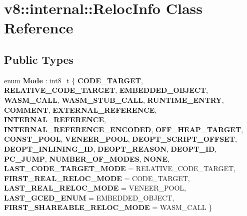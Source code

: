 \hypertarget{classv8_1_1internal_1_1RelocInfo}{}\section{v8\+:\+:internal\+:\+:Reloc\+Info Class Reference}
\label{classv8_1_1internal_1_1RelocInfo}
\subsection*{Public Types}
\begin{DoxyCompactItemize}
\item 
\mbox{\label{classv8_1_1internal_1_1RelocInfo_ad2e613bbaf7c7a82f0db322c069cad8e}} 
enum {\bfseries Mode} \+: int8\+\_\+t \{ \newline
{\bfseries C\+O\+D\+E\+\_\+\+T\+A\+R\+G\+ET}, 
{\bfseries R\+E\+L\+A\+T\+I\+V\+E\+\_\+\+C\+O\+D\+E\+\_\+\+T\+A\+R\+G\+ET}, 
{\bfseries E\+M\+B\+E\+D\+D\+E\+D\+\_\+\+O\+B\+J\+E\+CT}, 
{\bfseries W\+A\+S\+M\+\_\+\+C\+A\+LL}, 
\newline
{\bfseries W\+A\+S\+M\+\_\+\+S\+T\+U\+B\+\_\+\+C\+A\+LL}, 
{\bfseries R\+U\+N\+T\+I\+M\+E\+\_\+\+E\+N\+T\+RY}, 
{\bfseries C\+O\+M\+M\+E\+NT}, 
{\bfseries E\+X\+T\+E\+R\+N\+A\+L\+\_\+\+R\+E\+F\+E\+R\+E\+N\+CE}, 
\newline
{\bfseries I\+N\+T\+E\+R\+N\+A\+L\+\_\+\+R\+E\+F\+E\+R\+E\+N\+CE}, 
{\bfseries I\+N\+T\+E\+R\+N\+A\+L\+\_\+\+R\+E\+F\+E\+R\+E\+N\+C\+E\+\_\+\+E\+N\+C\+O\+D\+ED}, 
{\bfseries O\+F\+F\+\_\+\+H\+E\+A\+P\+\_\+\+T\+A\+R\+G\+ET}, 
{\bfseries C\+O\+N\+S\+T\+\_\+\+P\+O\+OL}, 
\newline
{\bfseries V\+E\+N\+E\+E\+R\+\_\+\+P\+O\+OL}, 
{\bfseries D\+E\+O\+P\+T\+\_\+\+S\+C\+R\+I\+P\+T\+\_\+\+O\+F\+F\+S\+ET}, 
{\bfseries D\+E\+O\+P\+T\+\_\+\+I\+N\+L\+I\+N\+I\+N\+G\+\_\+\+ID}, 
{\bfseries D\+E\+O\+P\+T\+\_\+\+R\+E\+A\+S\+ON}, 
\newline
{\bfseries D\+E\+O\+P\+T\+\_\+\+ID}, 
{\bfseries P\+C\+\_\+\+J\+U\+MP}, 
{\bfseries N\+U\+M\+B\+E\+R\+\_\+\+O\+F\+\_\+\+M\+O\+D\+ES}, 
{\bfseries N\+O\+NE}, 
\newline
{\bfseries L\+A\+S\+T\+\_\+\+C\+O\+D\+E\+\_\+\+T\+A\+R\+G\+E\+T\+\_\+\+M\+O\+DE} = R\+E\+L\+A\+T\+I\+V\+E\+\_\+\+C\+O\+D\+E\+\_\+\+T\+A\+R\+G\+ET, 
{\bfseries F\+I\+R\+S\+T\+\_\+\+R\+E\+A\+L\+\_\+\+R\+E\+L\+O\+C\+\_\+\+M\+O\+DE} = C\+O\+D\+E\+\_\+\+T\+A\+R\+G\+ET, 
{\bfseries L\+A\+S\+T\+\_\+\+R\+E\+A\+L\+\_\+\+R\+E\+L\+O\+C\+\_\+\+M\+O\+DE} = V\+E\+N\+E\+E\+R\+\_\+\+P\+O\+OL, 
{\bfseries L\+A\+S\+T\+\_\+\+G\+C\+E\+D\+\_\+\+E\+N\+UM} = E\+M\+B\+E\+D\+D\+E\+D\+\_\+\+O\+B\+J\+E\+CT, 
\newline
{\bfseries F\+I\+R\+S\+T\+\_\+\+S\+H\+A\+R\+E\+A\+B\+L\+E\+\_\+\+R\+E\+L\+O\+C\+\_\+\+M\+O\+DE} = W\+A\+S\+M\+\_\+\+C\+A\+LL
 \}
\end{DoxyCompactItemize}
